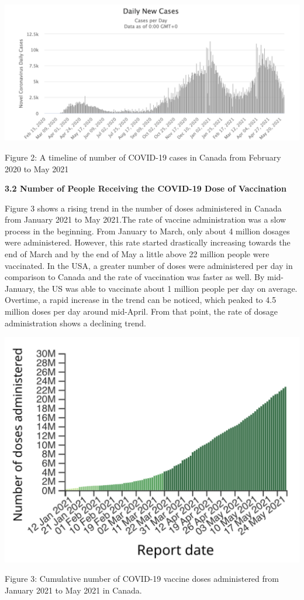 \documentclass[10pt,twocolumn,letterpaper]{article}
\begin{document}
\includegraphics[scale=0.30]{fig2.png}
\caption{Figure 2: A timeline of number of COVID-19 cases in Canada from February 2020 to May 2021}

\textbf{3.2 Number of People Receiving the COVID-19 Dose of Vaccination}

Figure 3 shows a rising trend in the number of doses administered in Canada from January 2021 to May 2021.The rate of vaccine administration was a slow process in the beginning. From January to March, only about 4 million dosages were administered. However, this rate started drastically increasing towards the end of March and by the end of May a little above 22 million people were vaccinated. In the USA, a greater number of doses were administered per day in comparison to Canada and the rate of vaccination was faster as well. By mid-January, the US was able to vaccinate about 1 million people per day on average. Overtime, a rapid increase in the trend can be noticed, which peaked to 4.5 million doses per day around mid-April. From that point, the rate of dosage administration shows a declining trend.


\includegraphics[scale=0.33]{fig3.png}
\caption{Figure 3: Cumulative number of COVID-19 vaccine doses administered from January 2021 to May 2021 in Canada.}
\end{document}
